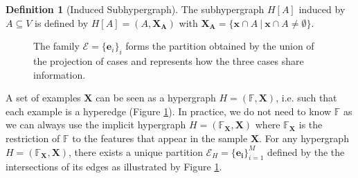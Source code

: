 \documentclass[preprint,12pt]{elsarticle}
\theoremstyle{definition}
\newtheorem{definition}{Definition}[section]
\begin{document}
\begin{definition}[Induced Subhypergraph]
The subhypergraph $H[A]$ induced by $A \subseteq V$ is defined by $H[A] = (A, \mathbf{X_A})$ with $\mathbf{X_A} = \{ \mathbf{x} \cap A ~ | ~ \mathbf{x} \cap A \neq \emptyset\}$.
\end{definition}
\begin{figure}[!h]
  \centering
  \def\firstcircle{(0,0) ellipse (1.5cm and 1cm)}
  \def\secondcircle{(80:-1cm) ellipse (1.5cm and 1cm)}
  \def\thirdcircle{(0:2cm) ellipse (1.5cm and 1cm)}
  \caption{\label{case_base} The family $\mathcal E = \{ \mathbf e_i \}_{i}$ forms the partition obtained by the union of the projection of cases and represents how the three cases share information.}
\end{figure}

A set of examples $\mathbf{X}$ can be seen as a hypergraph $H = (\mathbb F, \mathbf{X})$, i.e. such that each example is a hyperedge (Figure \ref{case_base}). In practice, we do not need to know $\mathbb{F}$ as we can always use the implicit hypergraph $H = (\mathbb{F}_{\mathbf X}, \mathbf{X})$ where $\mathbb{F}_\mathbf{X}$ is the restriction of $\mathbb{F}$ to the features that appear in the sample $\mathbf{X}$.
For any hypergraph $H = (\mathbb{F}_{\mathbf X}, \mathbf{X})$, there exists a unique partition $\mathcal{E}_H = \{\mathbf{e_i}\}^M_{i=1}$ defined by the the intersections of its edges as illustrated by Figure \ref{case_base}.
\end{document}
